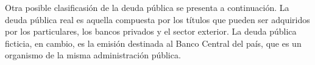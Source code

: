 \hspace*{0.4 cm} Otra posible clasificasi\'on de la deuda p\'ublica se presenta a continuaci\'on. La deuda p\'ublica real es aquella compuesta por los t\'itulos que pueden ser adquiridos por los particulares, los bancos privados y el sector exterior. La deuda p\'ublica ficticia, en cambio, es la emisi\'on destinada al Banco Central del pa\'is, que es un organismo de la misma administraci\'on p\'ublica.





% 
% 
% 
% 
% 
% 
% 
% 

